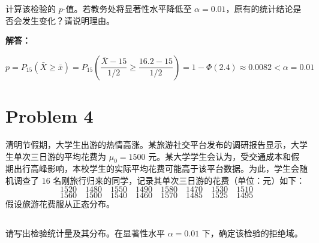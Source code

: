 \documentclass[12pt,a4paper]{article}
\begin{document}
计算该检验的 $p$-值。若教务处将显著性水平降低至 $\alpha=0.01$，原有的统计结论是否会发生变化？请说明理由。

\begin{answerbox}
\textbf{解答：}

$$
p = P_{15}\left(\bar{X} \geq \bar{x}\right) = P_{15}\left(\frac{\bar{X}-15}{1/2} \geq \frac{16.2-15}{1/2}\right) = 1- \Phi(2.4) \approx 0.0082 < \alpha = 0.01
$$

\end{answerbox}

\section{Problem 4}

清明节假期，大学生出游的热情高涨。某旅游社交平台发布的调研报告显示，大学生单次三日游的平均花费为 $\mu_0=1500$ 元。某大学学生会认为，受交通成本和假期出行高峰影响，本校学生的实际平均花费可能高于该平台数据。为此，学生会随机调查了 $16$ 名刚旅行归来的同学，记录其单次三日游的花费（单位：元）如下：
\[
1520\quad 1480\quad 1550\quad 1490\quad 1580\quad 1470\quad 1530\quad 1510
\]
\[
1560\quad 1500\quad 1540\quad 1460\quad 1570\quad 1485\quad 1525\quad 1495
\]
假设旅游花费服从正态分布。

\subsection{}

请写出检验统计量及其分布。在显著性水平 $\alpha=0.01$ 下，确定该检验的拒绝域。
\end{document}
